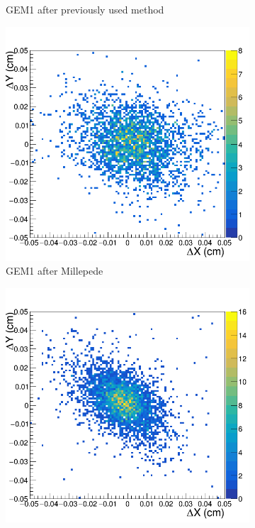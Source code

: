 \begin{figure}[h!]
\begin{subfigure}[l]{.45\textwidth}
   \caption{GEM1 after previously used method}
   \label{fig:GEM1_after_prev}
 \end{subfigure}
 \begin{subfigure}[r]{.45\textwidth}
   \centering
   \includegraphics[width=\linewidth]{thesis_figures/alignment/Run_3211_after_millepede/square/GEM1.png}
   \caption{GEM1 after Millepede}
 \end{subfigure}
 \hfill
 \begin{subfigure}[l]{.45\textwidth}
   \centering
   \includegraphics[width=\linewidth]{thesis_figures/alignment/Run_3211_after_prev/square/GEM2.png}

\end{subfigure}
\end{figure}
